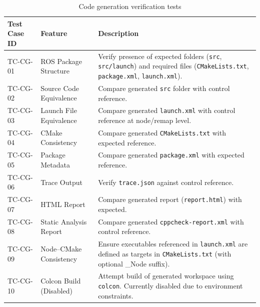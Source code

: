\bgroup
{}
\begin{xltabular}{\textwidth}{X X X}
	\caption{Code generation verification tests}
	\label{tab:codegen_tests}\\
	\toprule
	Test Case ID & Feature & Description \\
	\midrule
	TC-CG-01 & ROS Package Structure & Verify presence of expected folders (\texttt{src}, \texttt{src/launch}) and required files (\texttt{CMakeLists.txt}, \texttt{package.xml}, \texttt{launch.xml}). \\
	TC-CG-02 & Source Code Equivalence & Compare generated \texttt{src} folder with control reference. \\
	TC-CG-03 & Launch File Equivalence & Compare generated \texttt{launch.xml} with control reference at node/remap level. \\
	TC-CG-04 & CMake Consistency & Compare generated \texttt{CMakeLists.txt} with expected reference. \\
	TC-CG-05 & Package Metadata & Compare generated \texttt{package.xml} with expected reference. \\
	TC-CG-06 & Trace Output & Verify \texttt{trace.json} against control reference. \\
	TC-CG-07 & HTML Report & Compare generated report (\texttt{report.html}) with expected. \\
	TC-CG-08 & Static Analysis Report & Compare generated \texttt{cppcheck-report.xml} with control reference. \\
	TC-CG-09 & Node–CMake Consistency & Ensure executables referenced in \texttt{launch.xml} are defined as targets in \texttt{CMakeLists.txt} (with optional \_Node suffix).  \\
	TC-CG-10 & Colcon Build (Disabled) & Attempt build of generated workspace using \texttt{colcon}. Currently disabled due to environment constraints. \\
	\bottomrule
\end{xltabular}
\egroup








